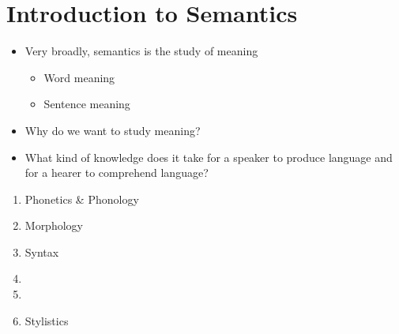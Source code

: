 \documentclass[a4paper,landscape,headrule,footrule,xetex,25pt]{foils}
\begin{document}






\section{Introduction to Semantics}

\begin{itemize}
\item Very broadly, semantics is the study of meaning
  \begin{itemize}
  \item Word meaning
  \item Sentence meaning
  \end{itemize}
\item Why do we want to study meaning?
\item What kind of knowledge does it take for a speaker to produce language and for a hearer to comprehend language? 
\end{itemize}

\begin{enumerate}\addtolength{\itemsep}{-0.75ex}
\item Phonetics \& Phonology
\item Morphology
\item Syntax
\item {}
\item {}
\item Stylistics
\end{enumerate}
\end{document}

